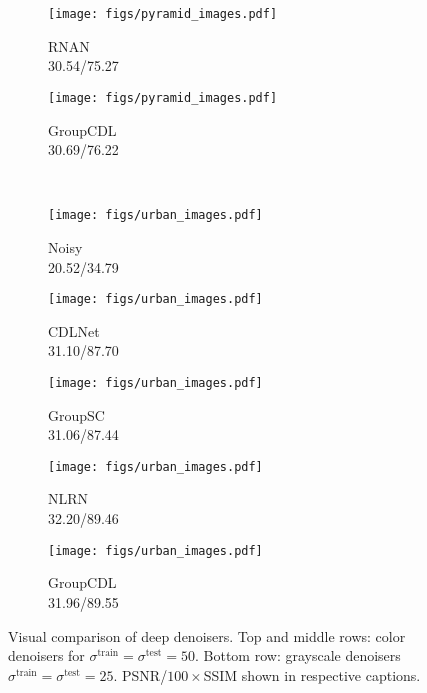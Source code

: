 \documentclass[lettersize,journal]{IEEEtran}
\newcommand{\sigmatrain}{\sigma^{\mathrm{train}}}
\newcommand{\sigmatest}{\sigma^{\mathrm{test}}}
\begin{document}
\begin{figure*}[thb]
\begin{subfigure}{0.19\textwidth}
\end{subfigure}\begin{subfigure}{0.19\textwidth}
    \centering
    \texttt{[image: figs/pyramid\_images.pdf]}
    \caption{RNAN \cite{zhang2019residual} \\ 30.54/75.27}
\end{subfigure}\begin{subfigure}{0.19\textwidth}
    \centering
    \texttt{[image: figs/pyramid\_images.pdf]}
    \caption{GroupCDL \\ 30.69/76.22}
\end{subfigure}     \\
    \begin{subfigure}{0.19\textwidth}
    \centering
    \texttt{[image: figs/urban\_images.pdf]}
    \caption{Noisy \\ 20.52/34.79}
\end{subfigure}\begin{subfigure}{0.19\textwidth}
    \centering
    \texttt{[image: figs/urban\_images.pdf]}
    \caption{CDLNet \cite{janjusevicCDLNet2022} \\ 31.10/87.70}
\end{subfigure}\begin{subfigure}{0.19\textwidth}
    \centering
    \texttt{[image: figs/urban\_images.pdf]}
    \caption{GroupSC \cite{lecouat2020nonlocal} \\ 31.06/87.44}
\end{subfigure}\begin{subfigure}{0.19\textwidth}
    \centering
    \texttt{[image: figs/urban\_images.pdf]}
    \caption{NLRN \cite{liu2018non} \\ 32.20/89.46}
\end{subfigure}\begin{subfigure}{0.19\textwidth}
    \centering
    \texttt{[image: figs/urban\_images.pdf]}
    \caption{GroupCDL \\ 31.96/89.55}
\end{subfigure}     \caption{
    Visual comparison of deep denoisers. Top and middle rows:
    color denoisers for $\sigmatrain=\sigmatest=50$. Bottom row: grayscale
    denoisers $\sigmatrain=\sigmatest=25$. PSNR/$100\times$SSIM shown in
    respective captions. 
    }
    \label{fig:colorsingle}
\end{figure*}
\end{document}
